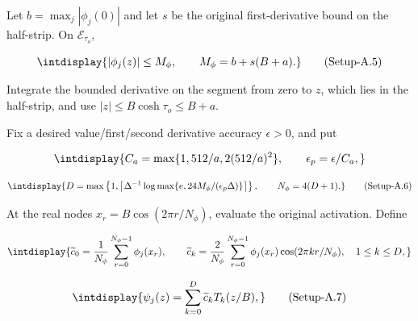 
Let \(b=\max_j|\phi_j(0)|\) and let \(s\) be the original first-derivative bound on the half-strip. On \(\mathcal E_{\tau_o}\),


\label{int:eq-setup-a-5}
\begingroup\renewcommand{\theHequation}{intdisplay.965}
\begin{equation}
\intdisplay{
|\phi_j(z)|\le M_\phi,\qquad M_\phi=b+s(B+a).
}
\tag{Setup-A.5}
\label{int:eq-0492-setup-a-5}
\end{equation}
\endgroup


Integrate the bounded derivative on the segment from zero to \(z\), which lies in the half-strip, and use \(|z|\le B\cosh\tau_o\le B+a\).



Fix a desired value/first/second derivative accuracy \(\epsilon>0\), and put


\begingroup\renewcommand{\theHequation}{intdisplay.966}
\begin{equation*}
\intdisplay{
C_a=\max\{1,512/a,2(512/a)^2\},\qquad
\epsilon_p=\epsilon/C_a,
}
\end{equation*}
\endgroup

\label{int:eq-setup-a-6}
\begingroup\renewcommand{\theHequation}{intdisplay.967}
\begin{equation}
\intdisplay{
D=\max\left\{1,\left\lceil
 \Delta^{-1}\log\max\{e,24M_\phi/(\epsilon_p\Delta)\}
 \right\rceil\right\},\qquad N_\phi=4(D+1).
}
\tag{Setup-A.6}
\label{int:eq-0493-setup-a-6}
\end{equation}
\endgroup


At the real nodes \(x_r=B\cos(2\pi r/N_\phi)\), evaluate the original activation. Define


\begingroup\renewcommand{\theHequation}{intdisplay.968}
\begin{equation*}
\intdisplay{
\widetilde c_0=\frac1{N_\phi}\sum_{r=0}^{N_\phi-1}\phi_j(x_r),
\qquad
\widetilde c_k=\frac2{N_\phi}\sum_{r=0}^{N_\phi-1}
       \phi_j(x_r)\cos(2\pi kr/N_\phi),\quad 1\le k\le D,
}
\end{equation*}
\endgroup

\label{int:eq-setup-a-7}
\begingroup\renewcommand{\theHequation}{intdisplay.969}
\begin{equation}
\intdisplay{
\psi_j(z)=\sum_{k=0}^D\widetilde c_k T_k(z/B),
}
\tag{Setup-A.7}
\label{int:eq-0494-setup-a-7}
\end{equation}
\endgroup

